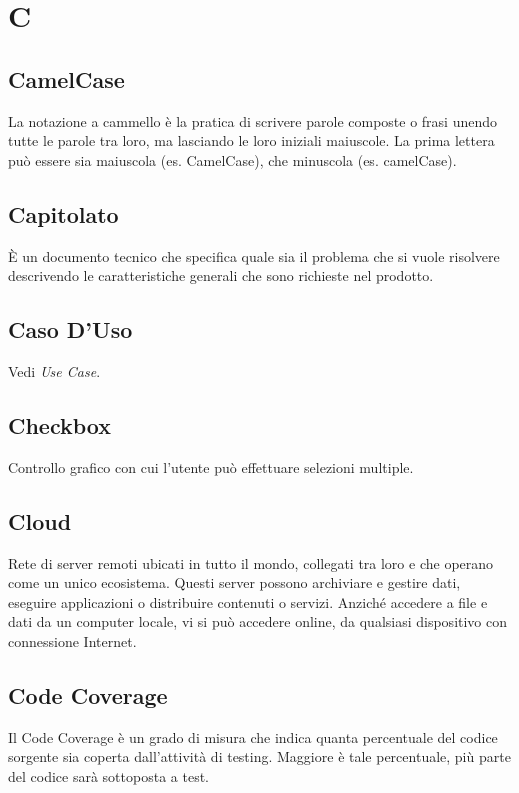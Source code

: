\section*{C}

\subsection{CamelCase}
La notazione a cammello è la pratica di scrivere parole composte o frasi unendo tutte le parole tra loro, ma lasciando le loro iniziali maiuscole. La prima lettera può essere sia maiuscola (es. CamelCase), che minuscola (es. camelCase).

\subsection{Capitolato}
È un documento tecnico che specifica quale sia il problema che si vuole risolvere descrivendo le caratteristiche generali che sono richieste nel prodotto.

\subsection{Caso D'Uso}
Vedi \textit{Use Case}.

\subsection{Checkbox}
Controllo grafico con cui l'utente può effettuare selezioni multiple. 

\subsection{Cloud}
Rete di server remoti ubicati in tutto il mondo, collegati tra loro e che operano come un unico ecosistema. Questi server possono archiviare e gestire dati, eseguire applicazioni o distribuire contenuti o servizi. Anziché accedere a file e dati da un computer locale, vi si può accedere online, da qualsiasi dispositivo con connessione Internet.

\subsection{Code Coverage}
Il Code Coverage è un grado di misura che indica quanta percentuale del codice sorgente sia coperta dall'attività di testing. Maggiore è tale percentuale, più parte del codice sarà sottoposta a test.

